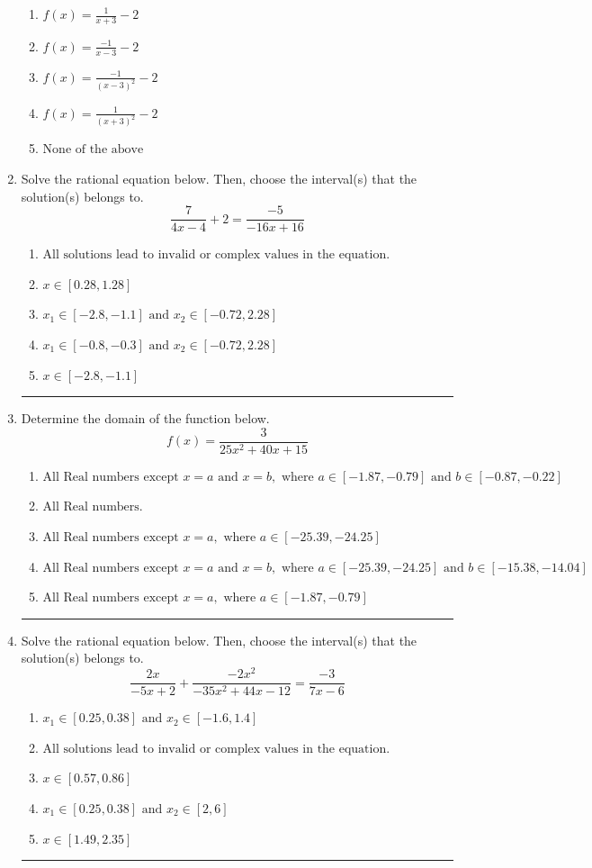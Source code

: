 \documentclass[14pt]{extbook}
\newcommand{\litem}[1]{\item#1\hspace*{-1cm}\rule{\textwidth}{0.4pt}}
\begin{document}
\begin{enumerate}
{\begin{center}
\end{center}
\begin{enumerate}[label=\Alph*.]
\item \( f(x) = \frac{1}{x + 3} - 2 \)
\item \( f(x) = \frac{-1}{x - 3} - 2 \)
\item \( f(x) = \frac{-1}{(x - 3)^2} - 2 \)
\item \( f(x) = \frac{1}{(x + 3)^2} - 2 \)
\item \( \text{None of the above} \)

\end{enumerate} }
\litem{
Solve the rational equation below. Then, choose the interval(s) that the solution(s) belongs to.\[ \frac{7}{4x -4} + 2 = \frac{-5}{-16x + 16} \]\begin{enumerate}[label=\Alph*.]
\item \( \text{All solutions lead to invalid or complex values in the equation.} \)
\item \( x \in [0.28,1.28] \)
\item \( x_1 \in [-2.8, -1.1] \text{ and } x_2 \in [-0.72,2.28] \)
\item \( x_1 \in [-0.8, -0.3] \text{ and } x_2 \in [-0.72,2.28] \)
\item \( x \in [-2.8,-1.1] \)

\end{enumerate} }
\litem{
Determine the domain of the function below.\[ f(x) = \frac{3}{25x^{2} +40 x + 15} \]\begin{enumerate}[label=\Alph*.]
\item \( \text{All Real numbers except } x = a \text{ and } x = b, \text{ where } a \in [-1.87, -0.79] \text{ and } b \in [-0.87, -0.22] \)
\item \( \text{All Real numbers.} \)
\item \( \text{All Real numbers except } x = a, \text{ where } a \in [-25.39, -24.25] \)
\item \( \text{All Real numbers except } x = a \text{ and } x = b, \text{ where } a \in [-25.39, -24.25] \text{ and } b \in [-15.38, -14.04] \)
\item \( \text{All Real numbers except } x = a, \text{ where } a \in [-1.87, -0.79] \)

\end{enumerate} }
\litem{
Solve the rational equation below. Then, choose the interval(s) that the solution(s) belongs to.\[ \frac{2x}{-5x + 2} + \frac{-2x^{2}}{-35x^{2} +44 x -12} = \frac{-3}{7x -6} \]\begin{enumerate}[label=\Alph*.]
\item \( x_1 \in [0.25, 0.38] \text{ and } x_2 \in [-1.6,1.4] \)
\item \( \text{All solutions lead to invalid or complex values in the equation.} \)
\item \( x \in [0.57,0.86] \)
\item \( x_1 \in [0.25, 0.38] \text{ and } x_2 \in [2,6] \)
\item \( x \in [1.49,2.35] \)


\end{enumerate}}
\end{enumerate}
\end{document}
